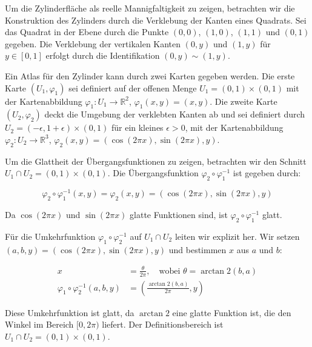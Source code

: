 Um die Zylinderfläche als reelle Mannigfaltigkeit zu zeigen, betrachten wir die Konstruktion des Zylinders durch die Verklebung der Kanten eines Quadrats. Sei das Quadrat in der Ebene durch die Punkte \((0,0)\), \((1,0)\), \((1,1)\) und \((0,1)\) gegeben. Die Verklebung der vertikalen Kanten \((0,y)\) und \((1,y)\) für \(y \in [0,1]\) erfolgt durch die Identifikation \((0,y) \sim (1,y)\).

Ein Atlas für den Zylinder kann durch zwei Karten gegeben werden. Die erste Karte \((U_1, \varphi_1)\) sei definiert auf der offenen Menge \(U_1 = (0,1) \times (0,1)\) mit der Kartenabbildung \(\varphi_1: U_1 \to \mathbb{R}^2\), \(\varphi_1(x,y) = (x,y)\). Die zweite Karte \((U_2, \varphi_2)\) deckt die Umgebung der verklebten Kanten ab und sei definiert durch \(U_2 = (-\epsilon, 1+\epsilon) \times (0,1)\) für ein kleines \(\epsilon > 0\), mit der Kartenabbildung \(\varphi_2: U_2 \to \mathbb{R}^3\), \(\varphi_2(x,y) = (\cos(2\pi x), \sin(2\pi x), y)\).

Um die Glattheit der Übergangsfunktionen zu zeigen, betrachten wir den Schnitt \(U_1 \cap U_2 = (0,1) \times (0,1)\). Die Übergangsfunktion \(\varphi_2 \circ \varphi_1^{-1}\) ist gegeben durch:

\[
\varphi_2 \circ \varphi_1^{-1}(x,y) = \varphi_2(x,y) = (\cos(2\pi x), \sin(2\pi x), y)
\]

Da \(\cos(2\pi x)\) und \(\sin(2\pi x)\) glatte Funktionen sind, ist \(\varphi_2 \circ \varphi_1^{-1}\) glatt.

Für die Umkehrfunktion \(\varphi_1 \circ \varphi_2^{-1}\) auf \(U_1 \cap U_2\) leiten wir explizit her. Wir setzen \((a, b, y) = (\cos(2\pi x), \sin(2\pi x), y)\) und bestimmen \(x\) aus \(a\) und \(b\):

\[
\begin{align*}
x &= \frac{\theta}{2\pi}, \quad \text{wobei } \theta = \arctan2(b, a) \\
\varphi_1 \circ \varphi_2^{-1}(a, b, y) &= \left(\frac{\arctan2(b, a)}{2\pi}, y\right)
\end{align*}
\]

Diese Umkehrfunktion ist glatt, da \(\arctan2\) eine glatte Funktion ist, die den Winkel im Bereich \([0, 2\pi)\) liefert. Der Definitionsbereich ist \(U_1 \cap U_2 = (0,1) \times (0,1)\).

